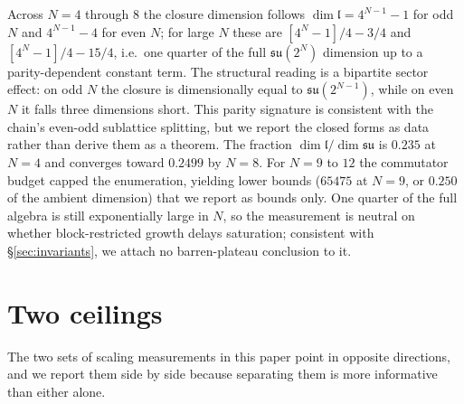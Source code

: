 \documentclass[twocolumn,aps,prl,superscriptaddress,showkeys]{revtex4-2}
\theoremstyle{plain}
\theoremstyle{definition}
\begin{document}
\begin{table}[htbp]
\centering
\caption{Measured dimension $\dim\mathfrak{l}$ of the Lie closure of the $3(N-1)$ per-pair generators of the LPTE chain, compared with $\dim\mathfrak{su}(2^{N})=4^{N}-1$. Rows $N\le8$ are exact (enumeration completed).}
\label{tab:lcc}
\end{table}

Across $N=4$ through $8$ the closure dimension follows $\dim\mathfrak{l}=4^{N-1}-1$ for odd $N$ and $4^{N-1}-4$ for even $N$; for large $N$ these are $[4^{N}-1]/4-3/4$ and $[4^{N}-1]/4-15/4$, i.e.\ one quarter of the full $\mathfrak{su}(2^{N})$ dimension up to a parity-dependent constant term. The structural reading is a bipartite sector effect: on odd $N$ the closure is dimensionally equal to $\mathfrak{su}(2^{N-1})$, while on even $N$ it falls three dimensions short. This parity signature is consistent with the chain's even-odd sublattice splitting, but we report the closed forms as data rather than derive them as a theorem. The fraction $\dim\mathfrak{l}/\dim\mathfrak{su}$ is $0.235$ at $N=4$ and converges toward $0.2499$ by $N=8$. For $N=9$ to $12$ the commutator budget capped the enumeration, yielding lower bounds ($65475$ at $N=9$, or $0.250$ of the ambient dimension) that we report as bounds only. One quarter of the full algebra is still exponentially large in $N$, so the measurement is neutral on whether block-restricted growth delays saturation; consistent with \S\ref{sec:invariants}, we attach no barren-plateau conclusion to it.%
\section{Two ceilings}
\label{sec:ceilings}

The two sets of scaling measurements in this paper point in opposite directions, and we report them side by side because separating them is more informative than either alone.
\end{document}
